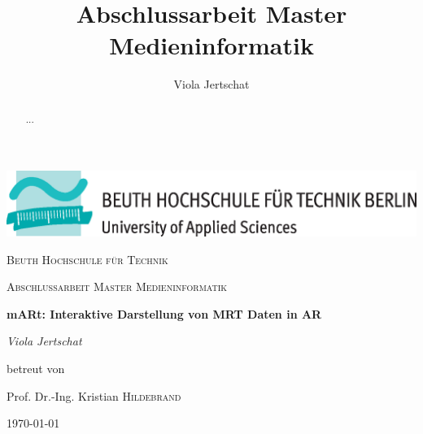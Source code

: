 \documentclass[a4paper,11pt]{report}
\title{Abschlussarbeit Master Medieninformatik}
\author{Viola Jertschat}
\begin{document}
\begin{titlepage}
	\centering
	\includegraphics[width=\textwidth]{images/beuthlogo.eps}\par\vspace{1cm}
	{\scshape\LARGE Beuth Hochschule für Technik \par}
	\vspace{1cm}
	{\scshape\Large Abschlussarbeit Master Medieninformatik\par}
	\vspace{1.5cm}
	{\huge\bfseries mARt: Interaktive Darstellung von MRT Daten in AR\par}
	\vspace{2cm}
	{\Large\itshape Viola Jertschat\par}
	\vfill
	betreut von\par
	Prof. Dr.-Ing. Kristian \textsc{Hildebrand}

	\vfill

	{\large \today\par}
\end{titlepage}

\begin{abstract} 
...
\end{abstract}

\tableofcontents

\listoffigures

\printglossaries


%








\pagebreak

\printbibliography
\end{document}
